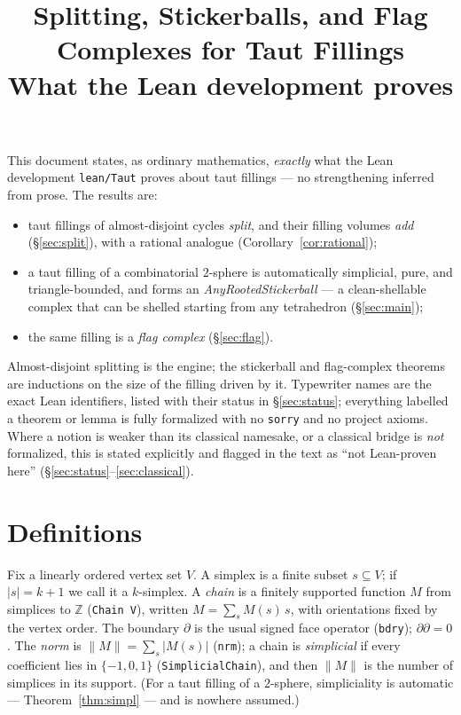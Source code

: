 \documentclass[11pt]{article}
\title{Splitting, Stickerballs, and Flag Complexes for Taut Fillings\\[2pt]
\large What the Lean development \code{lean/Taut} proves}
\author{}
\date{}
\theoremstyle{plain}
\theoremstyle{definition}
\theoremstyle{remark}
\newcommand{\bd}{\partial}
\newcommand{\Z}{\mathbb{Z}}
\newcommand{\code}[1]{\texttt{#1}}
\newcommand{\card}[1]{\lvert #1\rvert}
\newcommand{\norm}[1]{\lVert #1\rVert}
\begin{document}
\maketitle

\noindent
This document states, as ordinary mathematics, \emph{exactly} what the Lean development
\code{lean/Taut} proves about taut fillings --- no strengthening inferred from prose. The
results are:
\begin{itemize}
\item[(1)] taut fillings of almost-disjoint cycles \emph{split}, and their filling volumes
\emph{add} (\S\ref{sec:split}), with a rational analogue (Corollary~\ref{cor:rational});
\item[(2)] a taut filling of a combinatorial $2$-sphere is automatically simplicial, pure, and
triangle-bounded, and forms an \emph{AnyRootedStickerball} --- a clean-shellable complex that
can be shelled starting from any tetrahedron (\S\ref{sec:main});
\item[(3)] the same filling is a \emph{flag complex} (\S\ref{sec:flag}).
\end{itemize}
Almost-disjoint splitting is the engine; the stickerball and flag-complex theorems are
inductions on the size of the filling driven by it. Typewriter names are the exact Lean
identifiers, listed with their status in \S\ref{sec:status}; everything labelled a theorem or
lemma is fully formalized with no \code{sorry} and no project axioms. Where a notion is weaker
than its classical namesake, or a classical bridge is \emph{not} formalized, this is stated
explicitly and flagged in the text as ``not Lean-proven here'' (\S\ref{sec:status}--\ref{sec:classical}).

\section{Definitions}\label{sec:defs}

Fix a linearly ordered vertex set $V$. A simplex is a finite subset $s\subseteq V$; if
$\card{s}=k+1$ we call it a $k$-simplex. A \emph{chain} is a finitely supported function
$M$ from simplices to $\Z$ (\code{Chain V}), written $M=\sum_s M(s)\,s$, with orientations
fixed by the vertex order. The boundary $\bd$ is the usual signed face operator
(\code{bdry}); $\bd\bd=0$. The \emph{norm} is $\norm{M}=\sum_s\card{M(s)}$ (\code{nrm}); a
chain is \emph{simplicial} if every coefficient lies in $\{-1,0,1\}$
(\code{SimplicialChain}), and then $\norm{M}$ is the number of simplices in its support. (For a
taut filling of a $2$-sphere, simpliciality is automatic --- Theorem~\ref{thm:simpl} --- and is
nowhere assumed.)
\end{document}
